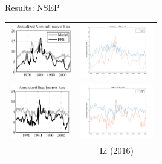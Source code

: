 \documentclass{beamer}
\begin{document}
\begin{frame}{Results: NSEP}
\begin{center}
\begin{tabular}{cc}
\includegraphics[height=90px]{figs/implied_ffr/nominal_3_collard.png} &
\includegraphics[height=90px]{figs/implied_ffr/nominal_3.png} \\
\includegraphics[height=90px]{figs/implied_ffr/real_3_collard.png} &
\includegraphics[height=90px]{figs/implied_ffr/real_3.png} \\
\cite{collard11} & Li (2016)
\end{tabular}
\end{center}
\end{frame}
\end{document}
